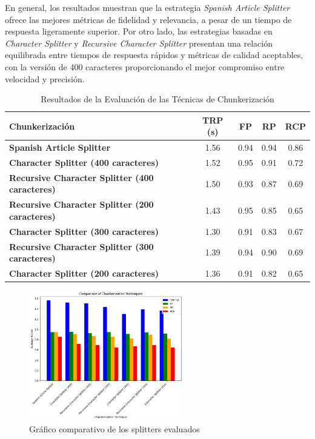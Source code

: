 En general, los resultados muestran que la estrategia \textit{Spanish Article Splitter} ofrece las mejores métricas de fidelidad y relevancia, a pesar de un tiempo de respuesta ligeramente superior. Por otro lado, las estrategias basadas en \textit{Character Splitter} y \textit{Recursive Character Splitter} presentan una relación equilibrada entre tiempos de respuesta rápidos y métricas de calidad aceptables, con la versión de 400 caracteres proporcionando el mejor compromiso entre velocidad y precisión.

\begin{table}[h]
\centering
\begin{tabular}{|l|c|c|c|c|}
\hline
\textbf{Chunkerización} & \textbf{TRP (s)} & \textbf{FP} & \textbf{RP} & \textbf{RCP} \\ \hline
\textbf{Spanish Article Splitter} & 1.56 & 0.94 & 0.94 & 0.86 \\ \hline
\textbf{Character Splitter (400 caracteres)} & 1.52 & 0.95 & 0.91 & 0.72 \\ \hline
\textbf{Recursive Character Splitter (400 caracteres)} & 1.50 & 0.93 & 0.87 & 0.69 \\ \hline
\textbf{Recursive Character Splitter (200 caracteres)} & 1.43 & 0.95 & 0.85 & 0.65 \\ \hline
\textbf{Character Splitter (300 caracteres)} & 1.30 & 0.91 & 0.83 & 0.67 \\ \hline
\textbf{Recursive Character Splitter (300 caracteres)} & 1.39 & 0.94 & 0.90 & 0.69 \\ \hline
\textbf{Character Splitter (200 caracteres)} & 1.36 & 0.91 & 0.82 & 0.65 \\ \hline
\end{tabular}
\caption{Resultados de la Evaluación de las Técnicas de Chunkerización}
\label{tab:chunk_results}
\end{table}

\begin{figure}[h]
\centering
\includegraphics[width=0.6\textwidth]{figuras/capitulo6/score_splitters.png}
\caption{Gráfico comparativo de los splitters evaluados}\label{fig:chunk_plot}
\end{figure}



